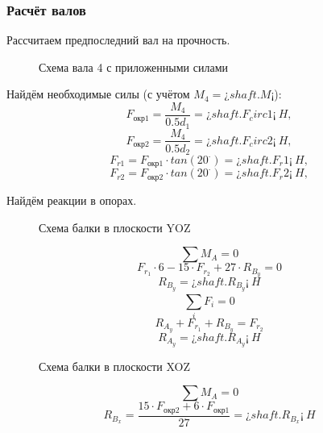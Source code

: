 \documentclass[14pt,a4paper,russian]{scrartcl}
\begin{document}
    \subsubsection{Расчёт валов}
        Рассчитаем предпоследний вал на прочность. 
        \begin{figure}[h]
            \caption{Схема вала 4 с приложенными силами}
        \end{figure}
        Найдём необходимые силы (с учётом \( M_4 = ¿shaft.M¡ \)):
        \[ F_{\text{окр1}} = \frac{M_4}{0.5d_1} = ¿shaft.F_circ1¡\ H,\]
        \[ F_{\text{окр2}} = \frac{M_4}{0.5d_2} = ¿shaft.F_circ2¡\ H,\]
        \[ F_{r1} = F_{\text{окр1}}\cdot tan(20^\cdot) = ¿shaft.F_r1¡\ H,\]
        \[ F_{r2} = F_{\text{окр2}}\cdot tan(20^\cdot) = ¿shaft.F_r2¡\ H,\]

        Найдём реакции в опорах.\par
        \begin{figure}[h]
            \caption{Схема балки в плоскости YOZ}
        \end{figure}
        \[ \sum M_A = 0 \]
        \[ F_{r_1}\cdot 6 - 15\cdot F_{r_2} + 27\cdot R_{B_y} = 0\]
        \[ R_{B_y} = ¿shaft.R_B_y¡\ H\]
        \[ \sum_{i}^{}F_i = 0 \]
        \[ R_{A_y} + F_{r_1} + R_{B_y} = F_{r_2} \]
        \[ R_{A_y} = ¿shaft.R_A_y¡\ H\]        
        
        \begin{figure}[h]
            \caption{Схема балки в плоскости XOZ}
        \end{figure}
        \[ \sum M_A = 0 \]
        \[ R_{B_x} = \frac{15\cdot F_{\text{окр2}} + 6\cdot F_{\text{окр1}}}{27} = ¿shaft.R_B_x¡\ H\]
        
\end{document}
